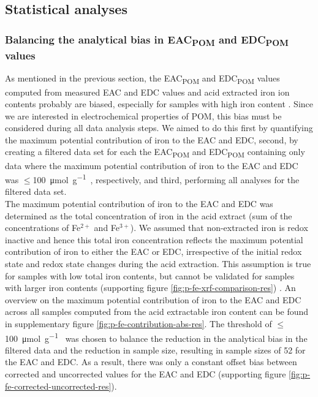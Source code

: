 \documentclass[alpha-refs]{wiley-article-rmd}
\begin{document}
\begin{refsection}
\hypertarget{statistical-analyses}{%
\subsection{Statistical analyses}\label{statistical-analyses}}

\hypertarget{balancing-the-analytical-bias-in-eac-and-edc-values}{%
\subsubsection{\texorpdfstring{Balancing the analytical bias in EAC\textsubscript{POM} and EDC\textsubscript{POM} values}{Balancing the analytical bias in EAC and EDC values}}\label{balancing-the-analytical-bias-in-eac-and-edc-values}}

As mentioned in the previous section, the EAC\textsubscript{POM} and EDC\textsubscript{POM} values computed from measured EAC and EDC values and acid extracted iron ion contents probably are biased, especially for samples with high iron content \autocite{Lau.2015,Lau.2016}. Since we are interested in electrochemical properties of POM, this bias must be considered during all data analysis steps. We aimed to do this first by quantifying the maximum potential contribution of iron to the EAC and EDC, second, by creating a filtered data set for each the EAC\textsubscript{POM} and EDC\textsubscript{POM} containing only data where the maximum potential contribution of iron to the EAC and EDC was \(\le\)\SI{100}{\micro\mol\per\gram\carbon}, respectively, and third, performing all analyses for the filtered data set.\\
The maximum potential contribution of iron to the EAC and EDC was determined as the total concentration of iron in the acid extract (sum of the concentrations of Fe\(^{2+}\) and Fe\(^{3+}\)). We assumed that non-extracted iron is redox inactive and hence this total iron concentration reflects the maximum potential contribution of iron to either the EAC or EDC, irrespective of the initial redox state and redox state changes during the acid extraction. This assumption is true for samples with low total iron contents, but cannot be validated for samples with larger iron contents (supporting figure \ref{fig:p-fe-xrf-comparison-res}) \autocite{Lau.2016}. An overview on the maximum potential contribution of iron to the EAC and EDC across all samples computed from the acid extractable iron content can be found in supplementary figure \ref{fig:p-fe-contribution-abs-res}. The threshold of \(\le\)\SI{100}{\micro\mol\per\gram\carbon} was chosen to balance the reduction in the analytical bias in the filtered data and the reduction in sample size, resulting in sample sizes of 52 for the EAC and EDC. As a result, there was only a constant offset bias between corrected and uncorrected values for the EAC and EDC (supporting figure \ref{fig:p-fe-corrected-uncorrected-res}).\\

\end{refsection}
\end{document}
